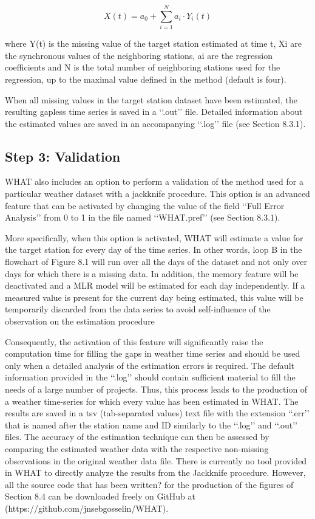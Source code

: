 \documentclass[TechnicalNoteMeteo.tex]{subfiles}
\begin{document}
\begin{equation}
    X(t) = a_0 + \sum_{i=1}^{N} a_i \cdot Y_i(t)
\end{equation}

where Y(t) is the missing value of the target station estimated at time t, Xi are the synchronous values of the neighboring stations, ai are the regression coefficients and N is the total number of neighboring stations used for the regression, up to the maximal value defined in the method (default is four).

When all missing values in the target station dataset have been estimated, the resulting gapless time series is saved in a ‘‘.out’’ file. Detailed information about the estimated values are saved in an accompanying ‘‘.log’’ file (see Section 8.3.1).

\subsection{Step 3: Validation}

WHAT also includes an option to perform a validation of the method used for a particular weather dataset with a jackknife procedure. This option is an advanced feature that can be activated by changing the value of the field ‘‘Full Error Analysis’’ from 0 to 1 in the file named ‘‘WHAT.pref’’ (see Section 8.3.1).

More specifically, when this option is activated, WHAT will estimate a value for the target station for every day of the time series. In other words, loop B in the flowchart of Figure 8.1 will run over all the days of the dataset and not only over days for which there is a missing data. In addition, the memory feature will be deactivated and a MLR model will be estimated for each day independently. If a measured value is present for the current day being estimated, this value will be temporarily discarded from the data series to avoid self-influence of the observation on the estimation procedure

Consequently, the activation of this feature will significantly raise the computation time for filling the gaps in weather time series and should be used only when a detailed analysis of the estimation errors is required. The default information provided in the ‘‘.log’’ should contain sufficient material to fill the needs of a large number of projects. Thus, this process leads to the production of a weather time-series for which every value has been estimated in WHAT. The results are saved in a tsv (tab-separated values) text file with the extension ‘‘.err’’ that is named after the station name and ID similarly to the ‘‘.log’’ and ‘‘.out’’ files.
The accuracy of the estimation technique can then be assessed by comparing the estimated weather data with the respective non-missing observations in the original weather data file. There is currently no tool provided in WHAT to directly analyze the results from the Jackknife procedure. However, all the source code that has been written? for the production of the figures of Section 8.4 can be downloaded freely on GitHub at (https://github.com/jnsebgosselin/WHAT).
\end{document}

